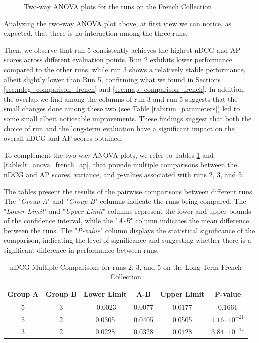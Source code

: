 \begin{figure}[!h]
\begin{subfigure}[b]{0.49\textwidth}
      \label{fig:lt_anova_french_ap}
    \end{subfigure}
    \caption{Two-way \ac{ANOVA} plots for the runs on the French Collection}
    \label{fig:lt_anova_french}
  \end{figure}

Analyzing the two-way \ac{ANOVA} plot above, at first view we can notice, as expected, that there is no interaction among the three runs.  

Then, we observe that run 5 consistently achieves the highest \ac{nDCG}  and \ac{AP} scores across different evaluation points. 
Run 2 exhibits lower performance compared to the other runs, while run 3 shows a relatively stable performance, albeit slightly lower than Run 5, confirming what we found in Sections \ref{sec:ndcg_comparison_french} and \ref{sec:map_comparison_french}.
In addition, the overlap we find among the columns of run 3 and run 5 suggests that the small changes done among these two (see Table \ref{tab:run_parameters}) led to some small albeit noticeable improvements. 
These findings suggest that both the choice of run and the long-term evaluation have a significant impact on the overall \ac{nDCG} and \ac{AP} scores obtained.

To complement the two-way \ac{ANOVA} plots, we refer to Tables \ref{table:lt_anova_french} and \ref{table:lt_anova_french_ap}, that provide multiple comparisons between the \ac{nDCG} and \ac{AP} scores, variance, and p-values associated with runs 2, 3, and 5. 

The tables present the results of the pairwise comparisons between different runs. 
The "\textit{Group A}" and "\textit{Group B}" columns indicate the runs being compared. 
The "\textit{Lower Limit}" and "\textit{Upper Limit}" columns represent the lower and upper bounds of the confidence interval, while the "\textit{A-B}" column indicates the mean difference between the runs. 
The "\textit{P-value}" column displays the statistical significance of the comparison, indicating the level of significance and suggesting whether there is a significant difference in performance between runs.

\newpage
\begin{table}[!h]
    \centering
    \caption{\ac{nDCG} Multiple Comparisons for runs 2, 3, and 5 on the Long Term French Collection}
    \label{table:lt_anova_french}
    \begin{tabular}{cccccc}
    \hline
    Group A & Group B & Lower Limit & A-B & Upper Limit & P-value \\ \hline
    5 & 3 & -0.0023 & 0.0077 & 0.0177 & 0.1661 \\
    5 & 2 & 0.0305 & 0.0405 & 0.0505 & $1.16 \cdot 10^{-21}$ \\
    3 & 2 & 0.0228 & 0.0328 & 0.0428 & $3.84 \cdot 10^{-14}$ \\ \hline
    \end{tabular}
\end{table}

